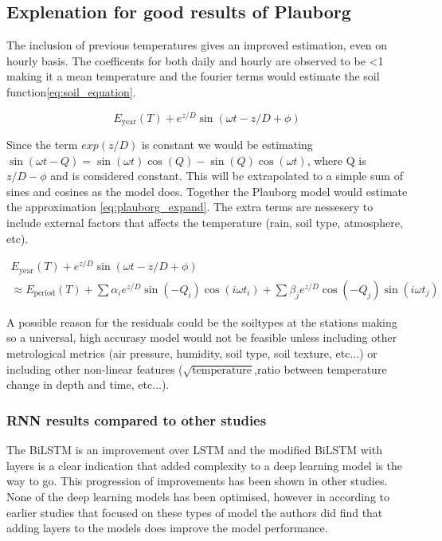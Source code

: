 \subsection{Explenation for good results of Plauborg}

The inclusion of previous temperatures gives an improved estimation, even on hourly basis. The coefficents for both daily and hourly are observed to be <1 making it a mean temperature and the fourier terms would estimate the soil function\eqref{eq:soil_equation}\cite{holmes_estimating_2008}.

\begin{equation}
E_{\text{year}}(T) + e^{z/D}\sin(\omega t - z/D + \phi)\label{eq:soil_equation}
\end{equation}

Since the term $exp(z/D)$ is constant we would be estimating $\sin(\omega t - Q) = \sin(\omega t)\cos(Q) - \sin(Q)\cos(\omega t)$, where Q is $z/D - \phi$ and is considered constant. This will be extrapolated to a simple sum of sines and cosines as the model does. Together the Plauborg model would estimate the approximation \eqref{eq:plauborg_expand}. The extra terms are nessesery to include external factors that affects the temperature (rain, soil type, atmosphere, etc). 

\begin{align}
E_{\text{year}}(T) + e^{z/D}\sin(\omega t - z/D + \phi) \\
\approx E_{\text{period}}(T) + \sum \alpha_ie^{z/D}\sin(-Q_i)\cos(i\omega t_i) + \sum \beta_je^{z/D}\cos(-Q_j)\sin(i\omega t_j)\label{eq:plauborg_expand}
\end{align}

A possible reason for the residuals could be the soiltypes at the stations making so a universal, high accurasy model would not be feasible unless including other metrological metrics (air pressure, humidity, soil type, soil texture, etc$\dots$) or including other non-linear features ($\sqrt{\text{temperature}}$,ratio between temperature change in depth and time, etc$\dots$).
 
\subsubsection{RNN results compared to other studies}
 
The BiLSTM is an improvement over LSTM and the modified BiLSTM with layers is a clear indication that added complexity to a deep learning model is the way to go. This progression of improvements has been shown in other studies\cite{feng_estimation_2019,citakoglu_comparison_2017,li_attention-aware_2022,li_gans-lstm_2020,wang_modeling_2022}. None of the deep learning models has been optimised, however in according to earlier studies that focused on these types of model the authors did find that adding layers to the models does improve the model performance. 

